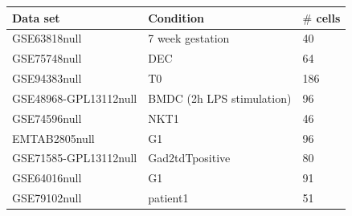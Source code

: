 \documentclass[aoas,preprint]{imsart}
\begin{document}
\begin{table}[b]
\tiny
\centering
\begin{tabular}{ |p{2.5cm}|p{4.5cm}|p{2cm}|}
\hline
 Data set & Condition & $\#$ cells \\
\hline
\hline
GSE63818null & 7 week gestation  & 40 \\
\hline
GSE75748null & DEC  & 64\\
\hline
GSE94383null & T0 & 186\\
\hline
GSE48968-GPL13112null & BMDC (2h LPS stimulation) & 96\\
 \hline
 GSE74596null & NKT1 & 46\\
 \hline
 EMTAB2805null & G1 & 96\\
 \hline
GSE71585-GPL13112null &Gad2tdTpositive & 80 \\
\hline
GSE64016null & G1 & 91 \\
\hline
GSE79102null & patient1 & 51\\
\hline
\end{tabular}
\label{table:2}
\end{table}

\clearpage
\end{document}

